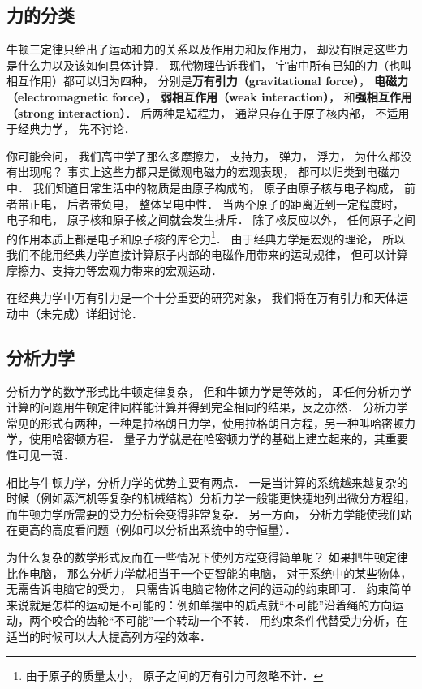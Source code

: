 \subsection{力的分类}
牛顿三定律只给出了运动和力的关系以及作用力和反作用力， 却没有限定这些力是什么力以及该如何具体计算． 现代物理告诉我们， 宇宙中所有已知的力（也叫相互作用）都可以归为四种， 分别是\textbf{万有引力（gravitational force）}， \textbf{电磁力（electromagnetic force）}， \textbf{弱相互作用（weak interaction）}， 和\textbf{强相互作用（strong interaction）}． 后两种是短程力， 通常只存在于原子核内部， 不适用于经典力学， 先不讨论．

你可能会问， 我们高中学了那么多摩擦力， 支持力， 弹力， 浮力， 为什么都没有出现呢？ 事实上这些力都只是微观电磁力的宏观表现， 都可以归类到电磁力中． 我们知道日常生活中的物质是由原子构成的， 原子由原子核与电子构成， 前者带正电， 后者带负电， 整体呈电中性． 当两个原子的距离近到一定程度时， 电子和电， 原子核和原子核之间就会发生排斥． 除了核反应以外， 任何原子之间的作用本质上都是电子和原子核的库仑力\footnote{由于原子的质量太小， 原子之间的万有引力可忽略不计．}． 由于经典力学是宏观的理论， 所以我们不能用经典力学直接计算原子内部的电磁作用带来的运动规律， 但可以计算摩擦力、支持力等宏观力带来的宏观运动．

在经典力学中万有引力是一个十分重要的研究对象， 我们将在万有引力和天体运动中（未完成）详细讨论．

\subsection{分析力学}
分析力学的数学形式比牛顿定律复杂， 但和牛顿力学是等效的， 即任何分析力学计算的问题用牛顿定律同样能计算并得到完全相同的结果，反之亦然． 分析力学常见的形式有两种，一种是拉格朗日力学，使用拉格朗日方程，另一种叫哈密顿力学，使用哈密顿方程． 量子力学就是在哈密顿力学的基础上建立起来的，其重要性可见一斑．%

相比与牛顿力学，分析力学的优势主要有两点． 一是当计算的系统越来越复杂的时候（例如蒸汽机等复杂的机械结构）分析力学一般能更快捷地列出微分方程组， 而牛顿力学所需要的受力分析会变得非常复杂． 另一方面， 分析力学能使我们站在更高的高度看问题（例如可以分析出系统中的守恒量）．

为什么复杂的数学形式反而在一些情况下使列方程变得简单呢？ 如果把牛顿定律比作电脑， 那么分析力学就相当于一个更智能的电脑， 对于系统中的某些物体， 无需告诉电脑它的受力， 只需告诉电脑它物体之间的运动的约束即可． 约束简单来说就是怎样的运动是不可能的：例如单摆中的质点就“不可能”沿着绳的方向运动，两个咬合的齿轮“不可能”一个转动一个不转． 用约束条件代替受力分析，在适当的时候可以大大提高列方程的效率．

